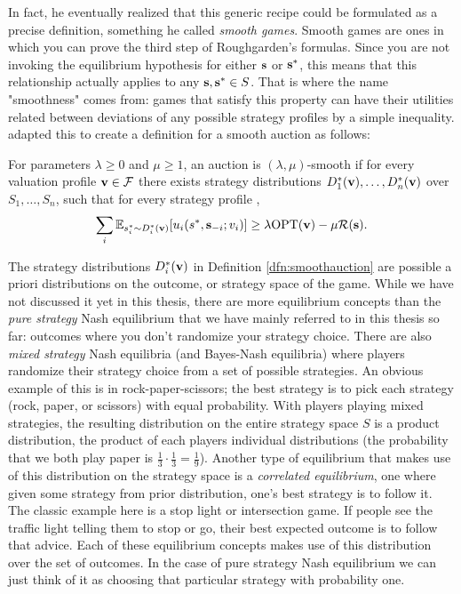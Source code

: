 \documentclass[12pt,twoside]{reedthesis}
\begin{document}
 In fact, he eventually realized that this generic recipe could be formulated as a precise definition, something he called {\em smooth games}. Smooth games are ones in which you can prove the third step of Roughgarden's formulas. Since you are not invoking the equilibrium hypothesis for either $\textbf{s}$ or $\textbf{s}^*$, this means that this relationship actually applies to any $\textbf{s},\textbf{s}^* \in S$. That is where the name "smoothness" comes from: games that satisfy this property can have their utilities related between deviations of any possible strategy profiles by a simple inequality. \cite{Syrgkanis2013} adapted this to create a definition for a smooth auction as follows:
\begin{dfn}
	For parameters $\lambda \geq 0$ and $\mu \geq 1$, an auction is $(\lambda, \mu)$-smooth if for every valuation profile $\textbf{v} \in \mathcal{F}$ there exists strategy distributions $D^*_1(\textbf{v}), \ldots, D^*_n(\textbf{v})$ over $S_1 , \ldots , S_n$, such that for every strategy profile \strategies,
	$$ \sum_i \mathbb{E}_{s^*_i \sim D^*_i(\textbf{v})}[u_i(s^*, \textbf{s}_{-i};v_i)] \geq \lambda \text{OPT}(\textbf{v}) - \mu \mathcal{R}(\textbf{s}).$$
	\label{dfn:smoothauction}
\end{dfn}
The strategy distributions $D^*_i(\textbf{v})$ in Definition \ref{dfn:smoothauction} are possible a priori distributions on the outcome, or strategy space of the game. While we have not discussed it yet in this thesis, there are more equilibrium concepts than the {\em pure strategy} Nash equilibrium that we have mainly referred to in this thesis so far: outcomes where you don't randomize your strategy choice. There are also {\em mixed strategy} Nash equilibria (and Bayes-Nash equilibria) where players randomize their strategy choice from a set of possible strategies. An obvious example of this is in rock-paper-scissors; the best strategy is to pick each strategy (rock, paper, or scissors) with equal probability. With players playing mixed strategies, the resulting distribution on the entire strategy space $S$ is a product distribution, the product of each players individual distributions (the probability that we both play paper is $\frac{1}{3} \cdot \frac{1}{3} = \frac{1}{9}$). Another type of equilibrium that makes use of this distribution on the strategy space is a {\em correlated equilibrium}, one where given some strategy from prior distribution, one's best strategy is to follow it. The classic example here is a stop light or intersection game. If people see the traffic light telling them to stop or go, their best expected outcome is to follow that advice. Each of these equilibrium concepts makes use of this distribution over the set of outcomes. In the case of pure strategy Nash equilibrium we can just think of it as choosing that particular strategy with probability one.
\end{document}

